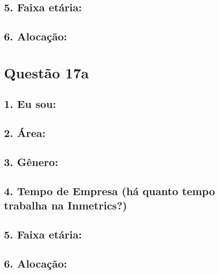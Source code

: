 \documentclass[]{book}
\begin{document}
\hypertarget{faixa-etaria-34}{%
\subsection{5. Faixa etária:}\label{faixa-etaria-34}}

\hypertarget{alocacao-34}{%
\subsection{6. Alocação:}\label{alocacao-34}}

\hypertarget{questao-17a}{%
\section{Questão 17a}\label{questao-17a}}

\hypertarget{eu-sou-35}{%
\subsection{1. Eu sou:}\label{eu-sou-35}}

\hypertarget{area-35}{%
\subsection{2. Área:}\label{area-35}}

\hypertarget{genero-35}{%
\subsection{3. Gênero:}\label{genero-35}}

\hypertarget{tempo-de-empresa-ha-quanto-tempo-trabalha-na-inmetrics-35}{%
\subsection{4. Tempo de Empresa (há quanto tempo trabalha na Inmetrics?)}\label{tempo-de-empresa-ha-quanto-tempo-trabalha-na-inmetrics-35}}

\hypertarget{faixa-etaria-35}{%
\subsection{5. Faixa etária:}\label{faixa-etaria-35}}

\hypertarget{alocacao-35}{%
\subsection{6. Alocação:}\label{alocacao-35}}
\end{document}
